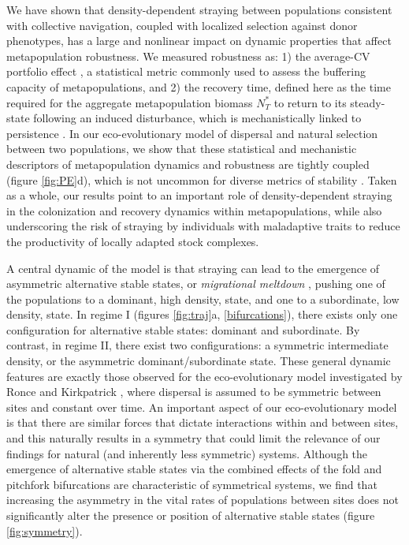 \documentclass{revtex4}
\begin{document}
We have shown that density-dependent straying between populations consistent with collective navigation, coupled with localized selection against donor phenotypes, has a large and nonlinear impact on dynamic properties that affect metapopulation robustness.
We measured robustness as:
1) the average-CV portfolio effect \citep{Anderson:2013gb,Anonymous:2015gf}, a statistical metric commonly used to assess the buffering capacity of metapopulations, and
2) the recovery time, defined here as the time required for the aggregate metapopulation biomass $N_T^*$ to return to its steady-state following an induced disturbance, which is mechanistically linked to persistence \citep{Ovaskainen:2002il}.
In our eco-evolutionary model of dispersal and natural selection between two populations, we show that these statistical and mechanistic descriptors of metapopulation dynamics and robustness are tightly coupled (figure \ref{fig:PE}d), which is not uncommon for diverse metrics of stability \citep{Donohue:2013iu}.
Taken as a whole, our results point to an important role of density-dependent straying in the colonization and recovery dynamics within metapopulations, while also underscoring the risk of straying by individuals with maladaptive traits to reduce the productivity of locally adapted stock complexes.

A central dynamic of the model is that straying can lead to the emergence of asymmetric alternative stable states, or \emph{migrational meltdown} \citep{Ronce:2001dp}, pushing one of the populations to a dominant, high density, state, and one to a subordinate, low density, state.
In regime I (figures \ref{fig:traj}a, \ref{bifurcations}), there exists only one configuration for alternative stable states: dominant and subordinate.
By contrast, in regime II, there exist two configurations: a symmetric intermediate density, or the asymmetric dominant/subordinate state.
These general dynamic features are exactly those observed for the eco-evolutionary model investigated by Ronce and Kirkpatrick \citep{Ronce:2001dp}, where dispersal is assumed to be symmetric between sites and constant over time.
An important aspect of our eco-evolutionary model is that there are similar forces that dictate interactions within and between sites, and this naturally results in a symmetry that could limit the relevance of our findings for natural (and inherently less symmetric) systems.
Although the emergence of alternative stable states via the combined effects of the fold and pitchfork bifurcations are characteristic of symmetrical systems, we find that increasing the asymmetry in the vital rates of populations between sites does not significantly alter the presence or position of alternative stable states (figure \ref{fig:symmetry}).
\end{document}

